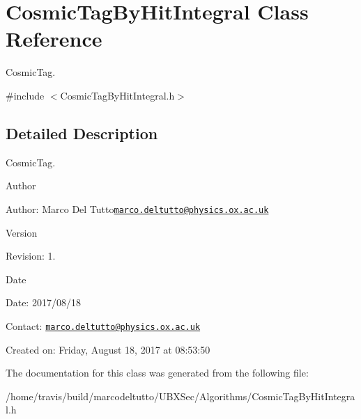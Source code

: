 \hypertarget{classCosmicTagByHitIntegral}{\section{Cosmic\-Tag\-By\-Hit\-Integral Class Reference}
\label{classCosmicTagByHitIntegral}
}


Cosmic\-Tag.  




{\ttfamily \#include $<$Cosmic\-Tag\-By\-Hit\-Integral.\-h$>$}



\subsection{Detailed Description}
Cosmic\-Tag. 

\begin{DoxyAuthor}{Author}

\end{DoxyAuthor}
\begin{DoxyParagraph}{Author\-:}
Marco Del Tutto\href{mailto:marco.deltutto@physics.ox.ac.uk}{\tt marco.\-deltutto@physics.\-ox.\-ac.\-uk} 
\end{DoxyParagraph}


\begin{DoxyVersion}{Version}

\end{DoxyVersion}
\begin{DoxyParagraph}{Revision\-:}
1. 
\end{DoxyParagraph}


\begin{DoxyDate}{Date}

\end{DoxyDate}
\begin{DoxyParagraph}{Date\-:}
2017/08/18 
\end{DoxyParagraph}


Contact\-: \href{mailto:marco.deltutto@physics.ox.ac.uk}{\tt marco.\-deltutto@physics.\-ox.\-ac.\-uk}

Created on\-: Friday, August 18, 2017 at 08\-:53\-:50 

The documentation for this class was generated from the following file\-:\begin{DoxyCompactItemize}
\item 
/home/travis/build/marcodeltutto/\-U\-B\-X\-Sec/\-Algorithms/Cosmic\-Tag\-By\-Hit\-Integral.\-h\end{DoxyCompactItemize}
